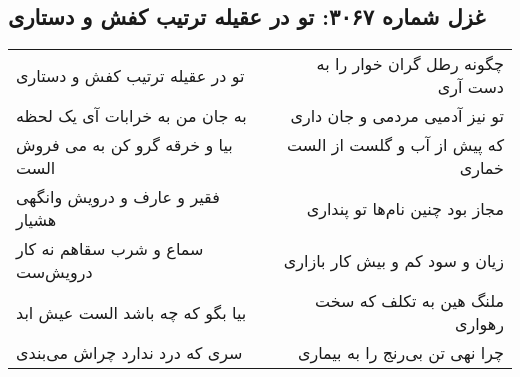 \begin{center}
\section*{غزل شماره ۳۰۶۷: تو در عقیله ترتیب کفش و دستاری}
\label{sec:3067}
\begin{longtable}{l p{0.5cm} r}
تو در عقیله ترتیب کفش و دستاری
&&
چگونه رطل گران خوار را به دست آری
\\
به جان من به خرابات آی یک لحظه
&&
تو نیز آدمیی مردمی و جان داری
\\
بیا و خرقه گرو کن به می فروش الست
&&
که پیش از آب و گلست از الست خماری
\\
فقیر و عارف و درویش وانگهی هشیار
&&
مجاز بود چنین نام‌ها تو پنداری
\\
سماع و شرب سقاهم نه کار درویش‌ست
&&
زیان و سود کم و بیش کار بازاری
\\
بیا بگو که چه باشد الست عیش ابد
&&
ملنگ هین به تکلف که سخت رهواری
\\
سری که درد ندارد چراش می‌بندی
&&
چرا نهی تن بی‌رنج را به بیماری
\\
\end{longtable}
\end{center}
